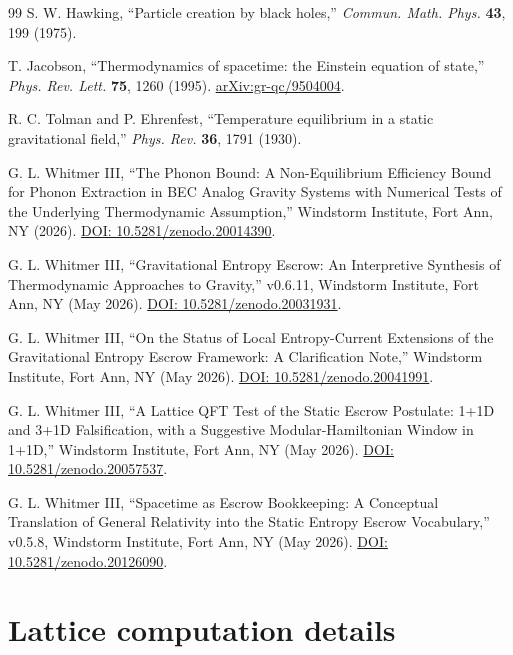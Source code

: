 \documentclass[11pt]{article}
\begin{document}
\begin{thebibliography}{99}
S. W. Hawking, ``Particle creation by black holes,''
\textit{Commun. Math. Phys.} \textbf{43}, 199 (1975).

T. Jacobson, ``Thermodynamics of spacetime: the Einstein equation of state,''
\textit{Phys. Rev. Lett.} \textbf{75}, 1260 (1995).
\href{https://arxiv.org/abs/gr-qc/9504004}{arXiv:gr-qc/9504004}.

R. C. Tolman and P. Ehrenfest, ``Temperature equilibrium in a static gravitational field,''
\textit{Phys. Rev.} \textbf{36}, 1791 (1930).

G. L. Whitmer III, ``The Phonon Bound: A Non-Equilibrium Efficiency Bound for Phonon Extraction in BEC Analog Gravity Systems with Numerical Tests of the Underlying Thermodynamic Assumption,''
Windstorm Institute, Fort Ann, NY (2026).
\href{https://doi.org/10.5281/zenodo.20014390}{DOI: 10.5281/zenodo.20014390}.

G. L. Whitmer III, ``Gravitational Entropy Escrow: An Interpretive Synthesis of Thermodynamic Approaches to Gravity,'' v0.6.11,
Windstorm Institute, Fort Ann, NY (May 2026).
\href{https://doi.org/10.5281/zenodo.20031931}{DOI: 10.5281/zenodo.20031931}.

G. L. Whitmer III, ``On the Status of Local Entropy-Current Extensions of the Gravitational Entropy Escrow Framework: A Clarification Note,''
Windstorm Institute, Fort Ann, NY (May 2026).
\href{https://doi.org/10.5281/zenodo.20041991}{DOI: 10.5281/zenodo.20041991}.

G. L. Whitmer III, ``A Lattice QFT Test of the Static Escrow Postulate: 1+1D and 3+1D Falsification, with a Suggestive Modular-Hamiltonian Window in 1+1D,''
Windstorm Institute, Fort Ann, NY (May 2026).
\href{https://doi.org/10.5281/zenodo.20057537}{DOI: 10.5281/zenodo.20057537}.

G. L. Whitmer III, ``Spacetime as Escrow Bookkeeping: A Conceptual Translation of General Relativity into the Static Entropy Escrow Vocabulary,'' v0.5.8,
Windstorm Institute, Fort Ann, NY (May 2026).
\href{https://doi.org/10.5281/zenodo.20126090}{DOI: 10.5281/zenodo.20126090}.

\end{thebibliography}

\appendix

\section{Lattice computation details}
\end{document}
